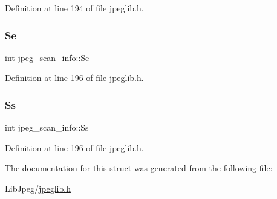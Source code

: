 Definition at line 194 of file jpeglib.\+h.

\mbox{\label{structjpeg__scan__info_a4eefb8be0412f78566862c28a20fb254}} 
\subsubsection{\texorpdfstring{Se}{Se}}
{\footnotesize\ttfamily int jpeg\+\_\+scan\+\_\+info\+::\+Se}



Definition at line 196 of file jpeglib.\+h.

\mbox{\label{structjpeg__scan__info_a33bc5abcded36ccd1b4c2ec94f6e2ba5}} 
\subsubsection{\texorpdfstring{Ss}{Ss}}
{\footnotesize\ttfamily int jpeg\+\_\+scan\+\_\+info\+::\+Ss}



Definition at line 196 of file jpeglib.\+h.



The documentation for this struct was generated from the following file\+:\begin{DoxyCompactItemize}
\item 
Lib\+Jpeg/\mbox{\hyperlink{jpeglib_8h}{jpeglib.\+h}}\end{DoxyCompactItemize}
